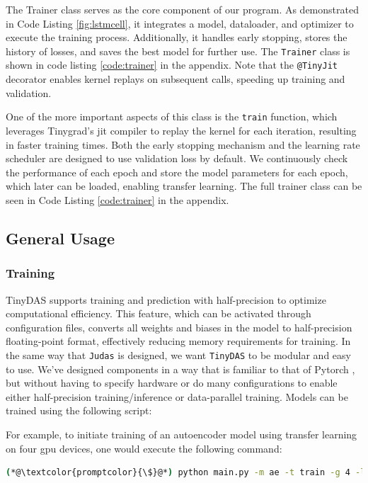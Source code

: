 The Trainer class serves as the core component of our program. As demonstrated in Code Listing \ref{fig:lstmcell}, it integrates a model, dataloader, and optimizer to execute the training process. Additionally, it handles early stopping, stores the history of losses, and saves the best model for further use. The \texttt{Trainer} class is shown in code listing \ref{code:trainer} in the appendix. Note that the \lstinline{@TinyJit} decorator enables kernel replays on subsequent calls, speeding up training and validation. 


One of the more important aspects of this class is the \texttt{train} function, which leverages Tinygrad's \acrshort{jit} compiler to replay the kernel for each iteration, resulting in faster training times. Both the early stopping mechanism and the learning rate scheduler are designed to use validation loss by default. We continuously check the performance of each epoch and store the model parameters for each epoch, which later can be loaded, enabling transfer learning. The full trainer class can be seen in Code Listing \ref{code:trainer} in the appendix.


\subsection{General Usage}

\subsubsection{Training}

TinyDAS supports training and prediction with half-precision to optimize computational efficiency. This feature, which can be activated through configuration files, converts all weights and biases in the model to half-precision floating-point format, effectively reducing memory requirements for training. In the same way that \texttt{Judas} is designed, we want \texttt{TinyDAS} to be modular and easy to use. We've designed components in a way that is familiar to that of Pytorch \cite{paszke2019pytorch}, but without having to specify hardware or do many configurations to enable either half-precision training/inference or data-parallel training. Models can be trained using the following script:





For example, to initiate training of an autoencoder model using transfer learning on four \acrshort{gpu} devices, one would execute the following command:
\begin{lstlisting}[style=shellcommand, language=bash]
(*@\textcolor{promptcolor}{\$}@*) python main.py -m ae -t train -g 4 -l
\end{lstlisting}

